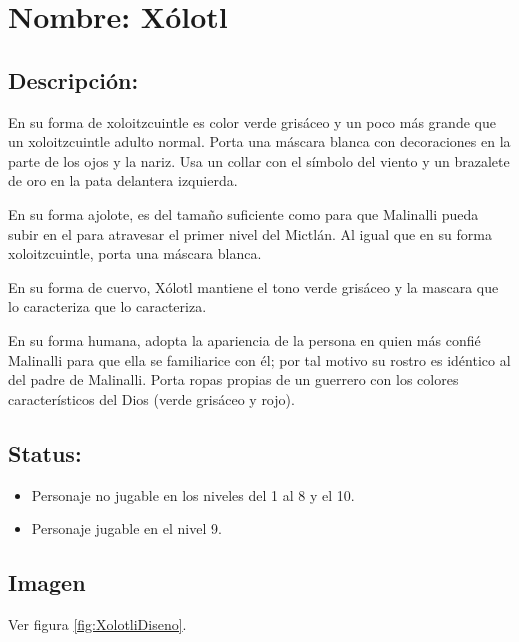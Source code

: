 \section{Nombre: Xólotl}  \label{per:xolotl}

\subsection{Descripción:}
En su forma de xoloitzcuintle es color verde grisáceo y un poco más grande que un xoloitzcuintle adulto normal. Porta una máscara blanca con decoraciones en la parte de los ojos y la nariz. Usa un collar con el símbolo del viento y un brazalete de oro en la pata delantera izquierda.
\\ 
\par
En su forma ajolote, es del tamaño suficiente como para que Malinalli pueda subir en el para atravesar el primer nivel del Mictlán. Al igual que en su forma xoloitzcuintle, porta una máscara blanca.
\\ 
\par
En su forma de cuervo, Xólotl mantiene el tono verde grisáceo y la mascara que lo caracteriza que lo caracteriza.
\\ 
\par
En su forma humana, adopta la apariencia de la persona en quien más confié Malinalli para que ella se familiarice con él; por tal motivo su rostro es idéntico al del padre de Malinalli. Porta ropas propias de un guerrero con los colores característicos del Dios (verde grisáceo y rojo). 
\subsection{Status:}
	\begin{itemize}
		\item Personaje no jugable en los niveles del 1 al 8 y el 10.
		\item Personaje jugable en el nivel 9.
	\end{itemize}
\subsection{Imagen}
Ver figura \ref{fig:XolotliDiseno}.



